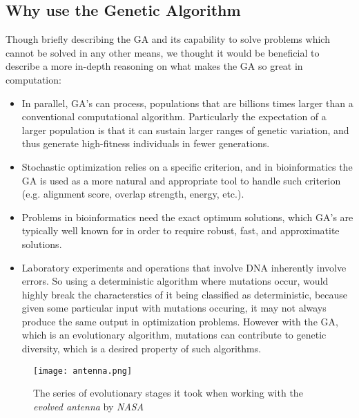 \subsection{Why use the Genetic Algorithm}

Though briefly describing the GA and its capability to solve problems which cannot be solved in any other means, we thought it would be beneficial to describe a more in-depth reasoning on what makes the GA so great in computation: 

\begin{itemize}

\item In parallel, GA's can process, populations that are billions times larger than a conventional computational algorithm. Particularly the expectation of a larger population is that it can sustain larger ranges of genetic variation, and thus generate high-fitness individuals in fewer generations. 

\item Stochastic optimization relies on a specific criterion, and in bioinformatics the GA is used as a more natural and appropriate tool to handle such criterion (e.g. alignment score, overlap strength, energy, etc.).

\item Problems in bioinformatics need the exact optimum solutions, which GA's are typically well known for in order to require robust, fast, and approximatite solutions. 

\item Laboratory experiments and operations that involve DNA inherently involve errors. So using a deterministic algorithm where mutations occur, would highly break the characterstics of it being classified as deterministic, because given some particular input with mutations occuring, it may not always produce the same output in optimization problems. However with the GA, which is an evolutionary algorithm, mutations can contribute to genetic diversity, which is a desired property of such algorithms.  

\end{itemize}

\begin{figure}[h]
\centering
\texttt{[image: antenna.png]}
\caption{The series of evolutionary stages it took when working with the \emph{evolved antenna} by \emph{NASA}}
\end{figure}


